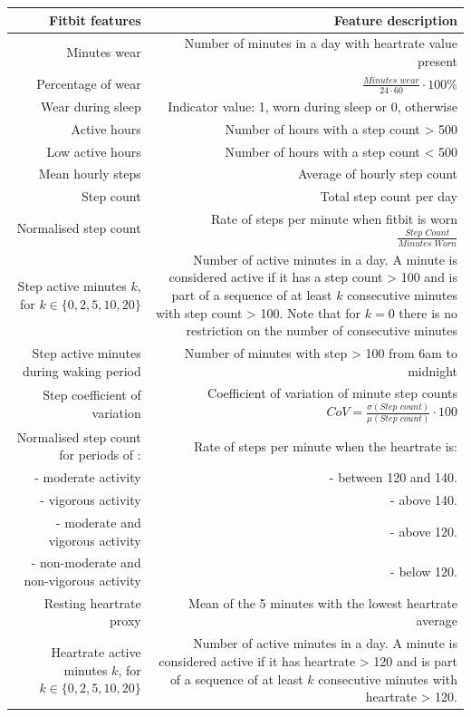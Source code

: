 \documentclass{article}
\begin{document}
\begin{longtable}{  n | d }
\toprule
\cmidrule(r){1-2}
\textbf{Fitbit features} & \textbf{Feature description} \\
\midrule
\endfirsthead
Minutes wear & Number of minutes in a day with heartrate value present \\
\midrule
Percentage of wear & $\frac{\textit{Minutes wear}}{24\cdot60}\cdot100\%$\\
\midrule
Wear during sleep & Indicator value: 1,  worn during sleep or 0, otherwise \\
\midrule
Active hours & Number of hours with a step count > 500  \\
\midrule
Low active hours & Number of hours with a step count < 500  \\
\midrule
Mean hourly steps & Average of hourly step count \\
\midrule
Step count & Total step count per day \\
\midrule
Normalised step count & Rate of steps per minute when fitbit is worn $\frac{\textit{Step Count}}{\textit{Minutes Worn}}$ \\
\midrule
 Step active minutes $k$, for $k\in \{0,2,5,10,20\}$ & Number of active minutes in a day. A minute is considered active if it has a step count > 100 and is part of a sequence of at least $k$ consecutive minutes with step count > 100. Note that for $k=0$ there is no restriction on the number of consecutive minutes\\
\midrule
Step active minutes during waking period & Number of minutes with step > 100 from 6am to midnight \\
\midrule
Step coefficient of variation & Coefficient of variation of minute step counts $CoV = \frac{\sigma (\textit{Step count})}{\mu (\textit{Step count})} \cdot 100$ \\
 \midrule
 Normalised step count for periods of : &  Rate of steps per minute when the heartrate is: \\
 - moderate activity & - between 120 and 140. \\ 
 - vigorous activity & - above 140. \\
 - moderate and vigorous activity & - above 120. \\
 - non-moderate and non-vigorous activity & - below 120.\\
 \midrule
 Resting heartrate proxy & Mean of the 5 minutes with the lowest heartrate average \\
 \midrule
Heartrate active minutes $k$, for $k\in \{0,2,5,10,20\}$ & Number of active minutes in a day. A minute is considered active if it has heartrate > 120 and is part of a sequence of at least $k$ consecutive minutes with heartrate > 120.\\

\end{longtable}
\end{document}
